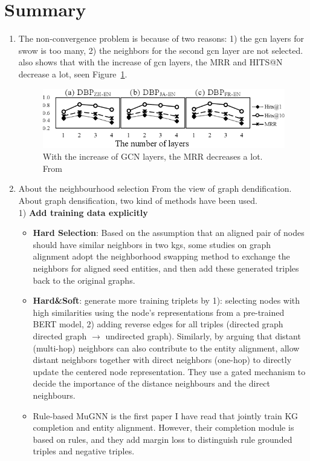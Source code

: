 \section{Summary}
\begin{enumerate}
    \item The non-convergence problem is because of two reasons: 1) the gcn layers for swow is too many, 2) the neighbors for the second gcn layer are not selected. \cite{Sun2019KnowledgeGA} also shows that with the increase of gcn layers, the MRR and HITS@N decrease a lot, seen Figure~\ref{fig:more_gcn_less_mrr}. 
    \begin{figure}[!ht]
    \centering
    \includegraphics[scale=0.5]{images/0505/6-Figure4-1.png}
    \caption{With the increase of GCN layers, the MRR decreases a lot. From \cite{Sun2019KnowledgeGA}}
    \label{fig:more_gcn_less_mrr}
    \end{figure}

     \item About the neighbourhood selection 
      From the view of graph dendification. About graph densification, two kind of methods have been used.  \\
         1)  \textbf{Add training data explicitly}
         \begin{itemize}
             \item \textbf{Hard Selection}: Based on the assumption that an aligned pair of nodes should have similar neighbors in two kgs, some studies \citep{Ye2019AVR,Hu2019MultiKEAM,Zhu2019NeighborhoodAwareAR} 
        on graph alignment adopt the neighborhood swapping method to exchange the neighbors for aligned seed entities, and then add these generated triples back to the original graphs.  \\
        \item \textbf{Hard\&Soft}:
        \cite{Malaviya2019ExploitingSA} generate more training triplets by 1): selecting nodes with high similarities using the node's representations from a pre-trained BERT model, 2) adding reverse edges for all triples (directed graph directed graph $\rightarrow$  undirected graph). 
        Similarly, by arguing that distant (multi-hop) neighbors can also contribute to the entity alignment, \cite{Sun2019KnowledgeGA} allow distant neighbors together with direct neighbors (one-hop) to directly update the centered node representation. They use a gated mechanism to decide the importance of the distance neighbours and the direct neighbours. 
        \item{Rule-based} 
         MuGNN \citep{cao-etal-2019-multi} is the first paper I have read that jointly train KG completion and entity alignment. However, their completion module is based on rules, and they add margin loss to distinguish rule grounded triples and negative triples. 
         

\end{itemize}
\end{enumerate}
